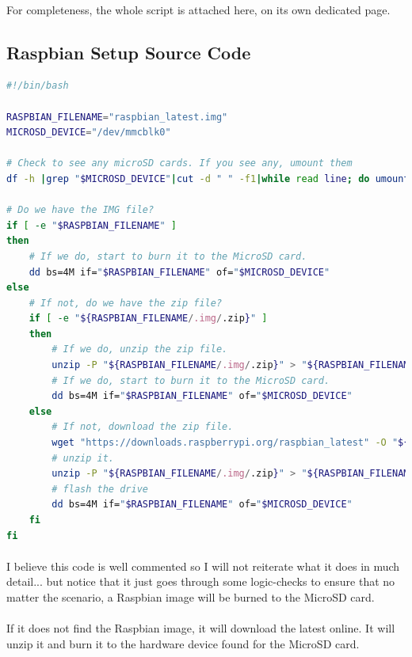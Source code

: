 \documentclass[11pt]{article}
\begin{document}
	\paragraph{} For completeness, the whole script is attached here, on its own dedicated page.

	\newpage

	\subsection{Raspbian Setup Source Code}

	\begin{lstlisting}[language=Bash]
#!/bin/bash

RASPBIAN_FILENAME="raspbian_latest.img"
MICROSD_DEVICE="/dev/mmcblk0"

# Check to see any microSD cards. If you see any, umount them
df -h |grep "$MICROSD_DEVICE"|cut -d " " -f1|while read line; do umount $line; done

# Do we have the IMG file?
if [ -e "$RASPBIAN_FILENAME" ]
then
	# If we do, start to burn it to the MicroSD card.
	dd bs=4M if="$RASPBIAN_FILENAME" of="$MICROSD_DEVICE"
else
	# If not, do we have the zip file?
	if [ -e "${RASPBIAN_FILENAME/.img/.zip}" ]
	then
		# If we do, unzip the zip file.
		unzip -P "${RASPBIAN_FILENAME/.img/.zip}" > "${RASPBIAN_FILENAME}"
		# If we do, start to burn it to the MicroSD card.
		dd bs=4M if="$RASPBIAN_FILENAME" of="$MICROSD_DEVICE"
	else
		# If not, download the zip file.
		wget "https://downloads.raspberrypi.org/raspbian_latest" -O "${RASPBIAN_FILENAME/.img/.zip}"
		# unzip it.
		unzip -P "${RASPBIAN_FILENAME/.img/.zip}" > "${RASPBIAN_FILENAME}"
		# flash the drive
		dd bs=4M if="$RASPBIAN_FILENAME" of="$MICROSD_DEVICE"
	fi
fi
	\end{lstlisting}	 

	\paragraph{}
	\hrulefill

	\paragraph{} I believe this code is well commented so I will not reiterate what it does in much detail... but notice that it just goes through some logic-checks to ensure that no matter the scenario, a Raspbian image will be burned to the MicroSD card.

	\paragraph{} If it does not find the Raspbian image, it will download the latest online. It will unzip it and burn it to the hardware device found for the MicroSD card.
\end{document}

